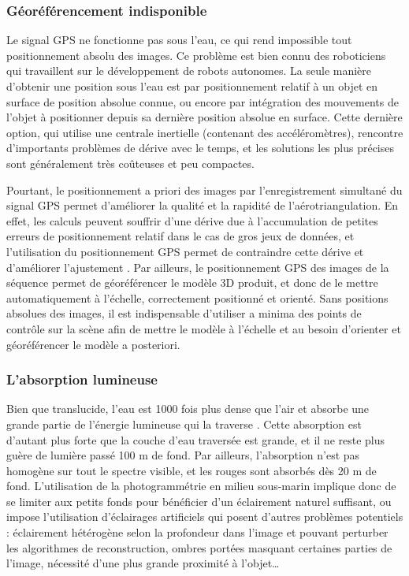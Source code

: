 \subsubsection{Géoréférencement indisponible}

Le signal GPS ne fonctionne pas sous l’eau, ce qui rend impossible tout positionnement absolu des images. Ce problème est bien connu des roboticiens qui travaillent sur le développement de robots autonomes. La seule manière d’obtenir une position sous l’eau est par positionnement relatif à un objet en surface de position absolue connue, ou encore par intégration des mouvements de l’objet à positionner depuis sa dernière position absolue en surface. Cette dernière option, qui utilise une centrale inertielle (contenant des accéléromètres), rencontre d’importants problèmes de dérive avec le temps, et les solutions les plus précises sont généralement très coûteuses et peu compactes.

Pourtant, le positionnement a priori des images par l’enregistrement simultané du signal GPS permet d’améliorer la qualité et la rapidité de l’aérotriangulation. En effet, les calculs peuvent souffrir d’une dérive due à l’accumulation de petites erreurs de positionnement relatif dans le cas de gros jeux de données, et l’utilisation du positionnement GPS permet de contraindre cette dérive et d’améliorer l’ajustement \citep{lhuillier_incremental_2012}. Par ailleurs, le positionnement GPS des images de la séquence permet de géoréférencer le modèle 3D produit, et donc de le mettre automatiquement à l’échelle, correctement positionné et orienté. Sans positions absolues des images, il est indispensable d’utiliser a minima des points de contrôle sur la scène afin de mettre le modèle à l’échelle et au besoin d’orienter et géoréférencer le modèle a posteriori.

\subsubsection{L’absorption lumineuse}

Bien que translucide, l’eau est 1000 fois plus dense que l’air et absorbe une grande partie de l’énergie lumineuse qui la traverse \citep{wozniak_light_2007}. Cette absorption est d’autant plus forte que la couche d’eau traversée est grande, et il ne reste plus guère de lumière passé 100 m de fond. Par ailleurs, l’absorption n’est pas homogène sur tout le spectre visible, et les rouges sont absorbés dès 20 m de fond. L’utilisation de la photogrammétrie en milieu sous-marin implique donc de se limiter aux petits fonds pour bénéficier d’un éclairement naturel suffisant, ou impose l’utilisation d’éclairages artificiels qui posent d’autres problèmes potentiels : éclairement hétérogène selon la profondeur dans l’image et pouvant perturber les algorithmes de reconstruction, ombres portées masquant certaines parties de l’image, nécessité d’une plus grande proximité à l’objet…

